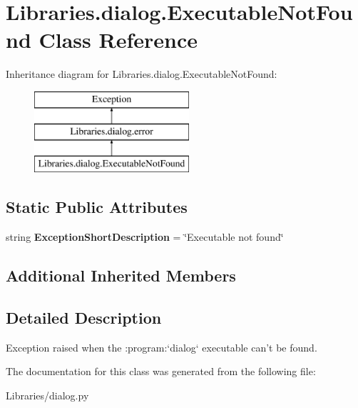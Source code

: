 \hypertarget{class_libraries_1_1dialog_1_1_executable_not_found}{}\section{Libraries.\+dialog.\+Executable\+Not\+Found Class Reference}
\label{class_libraries_1_1dialog_1_1_executable_not_found}
Inheritance diagram for Libraries.\+dialog.\+Executable\+Not\+Found\+:\begin{figure}[H]
\begin{center}
\leavevmode
\includegraphics[height=3.000000cm]{class_libraries_1_1dialog_1_1_executable_not_found}
\end{center}
\end{figure}
\subsection*{Static Public Attributes}
\begin{DoxyCompactItemize}
\item 
string {\bfseries Exception\+Short\+Description} = \char`\"{}Executable not found\char`\"{}\hypertarget{class_libraries_1_1dialog_1_1_executable_not_found_adcad67a27bb0cbf3c19664d61f673d69}{}\label{class_libraries_1_1dialog_1_1_executable_not_found_adcad67a27bb0cbf3c19664d61f673d69}

\end{DoxyCompactItemize}
\subsection*{Additional Inherited Members}


\subsection{Detailed Description}
\begin{DoxyVerb}Exception raised when the :program:`dialog` executable can't be found.\end{DoxyVerb}
 

The documentation for this class was generated from the following file\+:\begin{DoxyCompactItemize}
\item 
Libraries/dialog.\+py\end{DoxyCompactItemize}
